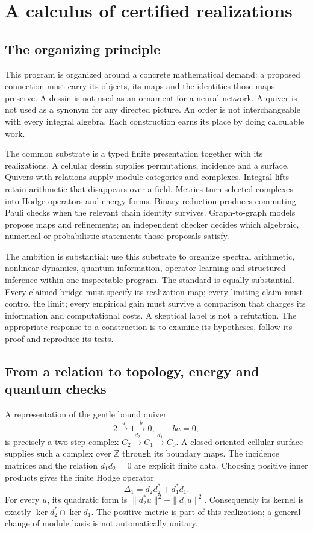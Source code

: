 \chapter{A calculus of certified realizations}
\label{ch:unified-program}

\section{The organizing principle}

This program is organized around a concrete mathematical demand: a proposed connection must carry its objects, its maps and the identities those maps preserve. A dessin is not used as an ornament for a neural network. A quiver is not used as a synonym for any directed picture. An order is not interchangeable with every integral algebra. Each construction earns its place by doing calculable work.

The common substrate is a typed finite presentation together with its realizations. A cellular dessin supplies permutations, incidence and a surface. Quivers with relations supply module categories and complexes. Integral lifts retain arithmetic that disappears over a field. Metrics turn selected complexes into Hodge operators and energy forms. Binary reduction produces commuting Pauli checks when the relevant chain identity survives. Graph-to-graph models propose maps and refinements; an independent checker decides which algebraic, numerical or probabilistic statements those proposals satisfy.

The ambition is substantial: use this substrate to organize spectral arithmetic, nonlinear dynamics, quantum information, operator learning and structured inference within one inspectable program. The standard is equally substantial. Every claimed bridge must specify its realization map; every limiting claim must control the limit; every empirical gain must survive a comparison that charges its information and computational costs. A skeptical label is not a refutation. The appropriate response to a construction is to examine its hypotheses, follow its proof and reproduce its tests.

\section{From a relation to topology, energy and quantum checks}

A representation of the gentle bound quiver
\[
 2\xrightarrow{a}1\xrightarrow{b}0,\qquad ba=0,
\]
is precisely a two-step complex $C_2\xrightarrow{d_2}C_1\xrightarrow{d_1}C_0$. A closed oriented cellular surface supplies such a complex over $\mathbb Z$ through its boundary maps. The incidence matrices and the relation $d_1d_2=0$ are explicit finite data. Choosing positive inner products gives the finite Hodge operator
\[
 \Delta_1=d_2d_2^*+d_1^*d_1.
\]
For every $u$, its quadratic form is $\|d_2^*u\|^2+\|d_1u\|^2$. Consequently its kernel is exactly $\ker d_2^*\cap\ker d_1$. The positive metric is part of this realization; a general change of module basis is not automatically unitary.

